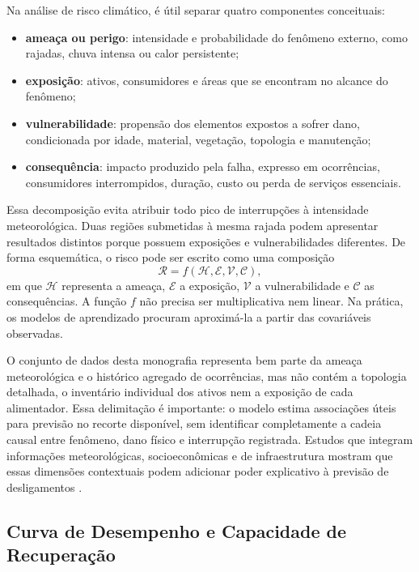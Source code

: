 Na análise de risco climático, é útil separar quatro componentes conceituais:
\begin{itemize}
    \item \textbf{ameaça ou perigo}: intensidade e probabilidade do fenômeno externo, como rajadas, chuva intensa ou calor persistente;
    \item \textbf{exposição}: ativos, consumidores e áreas que se encontram no alcance do fenômeno;
    \item \textbf{vulnerabilidade}: propensão dos elementos expostos a sofrer dano, condicionada por idade, material, vegetação, topologia e manutenção;
    \item \textbf{consequência}: impacto produzido pela falha, expresso em ocorrências, consumidores interrompidos, duração, custo ou perda de serviços essenciais.
\end{itemize}
Essa decomposição evita atribuir todo pico de interrupções à intensidade meteorológica. Duas regiões submetidas à mesma rajada podem apresentar resultados distintos porque possuem exposições e vulnerabilidades diferentes. De forma esquemática, o risco pode ser escrito como uma composição
\begin{equation}
    \mathcal{R}=f(\mathcal{H},\mathcal{E},\mathcal{V},\mathcal{C}),
    \label{eq:risco_componentes}
\end{equation}
em que $\mathcal{H}$ representa a ameaça, $\mathcal{E}$ a exposição, $\mathcal{V}$ a vulnerabilidade e $\mathcal{C}$ as consequências. A função $f$ não precisa ser multiplicativa nem linear. Na prática, os modelos de aprendizado procuram aproximá-la a partir das covariáveis observadas.

O conjunto de dados desta monografia representa bem parte da ameaça meteorológica e o histórico agregado de ocorrências, mas não contém a topologia detalhada, o inventário individual dos ativos nem a exposição de cada alimentador. Essa delimitação é importante: o modelo estima associações úteis para previsão no recorte disponível, sem identificar completamente a cadeia causal entre fenômeno, dano físico e interrupção registrada. Estudos que integram informações meteorológicas, socioeconômicas e de infraestrutura mostram que essas dimensões contextuais podem adicionar poder explicativo à previsão de desligamentos \cite{zhang2023deep}.

\subsection{Curva de Desempenho e Capacidade de Recuperação}

